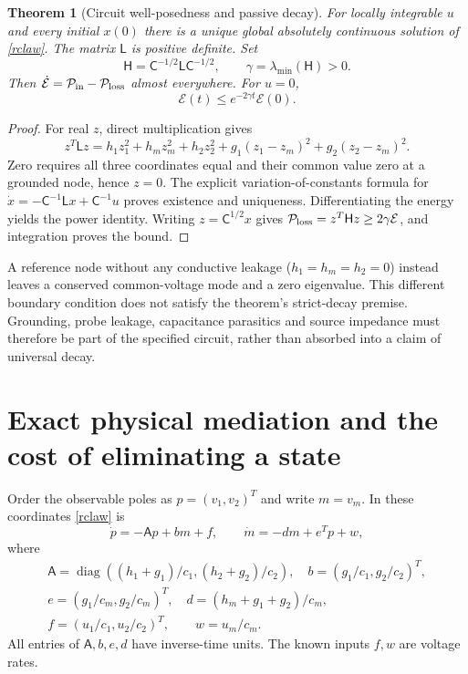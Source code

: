 \documentclass[11pt,letterpaper]{article}
\newcommand{\diag}{\operatorname{diag}}
\newtheorem{theorem}{Theorem}[section]
\theoremstyle{definition}
\numberwithin{equation}{section}
\begin{document}
\begin{theorem}[Circuit well-posedness and passive decay]\label{rcpassive}
For locally integrable $u$ and every initial $x(0)$ there is a unique global absolutely continuous solution of \eqref{rclaw}. The matrix $\mathsf L$ is positive definite. Set
\begin{equation}\label{rcdecayrate}
\mathsf H=\mathsf C^{-1/2}\mathsf L\mathsf C^{-1/2},\qquad
\gamma=\lambda_{\min}(\mathsf H)>0.
\end{equation}
Then $\dot{\mathcal E}=\mathcal P_{\rm in}-\mathcal P_{\rm loss}$ almost everywhere. For $u=0$,
\begin{equation}\label{rcpassivebound}
\mathcal E(t)\leq e^{-2\gamma t}\mathcal E(0).
\end{equation}
\end{theorem}
\begin{proof}
For real $z$, direct multiplication gives
\begin{equation}\label{rclaplacian}
z^T\mathsf Lz=h_1z_1^2+h_mz_m^2+h_2z_2^2+g_1(z_1-z_m)^2+g_2(z_2-z_m)^2.
\end{equation}
Zero requires all three coordinates equal and their common value zero at a grounded node, hence $z=0$. The explicit variation-of-constants formula for $\dot x=-\mathsf C^{-1}\mathsf Lx+\mathsf C^{-1}u$ proves existence and uniqueness. Differentiating the energy yields the power identity. Writing $z=\mathsf C^{1/2}x$ gives $\mathcal P_{\rm loss}=z^T\mathsf Hz\geq2\gamma\mathcal E$, and integration proves the bound.
\end{proof}
A reference node without any conductive leakage ($h_1=h_m=h_2=0$) instead leaves a conserved common-voltage mode and a zero eigenvalue. This different boundary condition does not satisfy the theorem's strict-decay premise. Grounding, probe leakage, capacitance parasitics and source impedance must therefore be part of the specified circuit, rather than absorbed into a claim of universal decay.

\section{Exact physical mediation and the cost of eliminating a state}
Order the observable poles as $p=(v_1,v_2)^T$ and write $m=v_m$. In these coordinates \eqref{rclaw} is
\begin{equation}\label{rcblock}
\dot p=-\mathsf A p+b m+f,\qquad
\dot m=-d m+e^Tp+w,
\end{equation}
where
\begin{equation}\label{rcblocks}
\begin{gathered}
\mathsf A=\diag((h_1+g_1)/c_1,(h_2+g_2)/c_2),\quad b=(g_1/c_1,g_2/c_2)^T,\\
e=(g_1/c_m,g_2/c_m)^T,\quad d=(h_m+g_1+g_2)/c_m,\\
f=(u_1/c_1,u_2/c_2)^T,\qquad w=u_m/c_m.
\end{gathered}
\end{equation}
All entries of $\mathsf A,b,e,d$ have inverse-time units. The known inputs $f,w$ are voltage rates.
\end{document}
